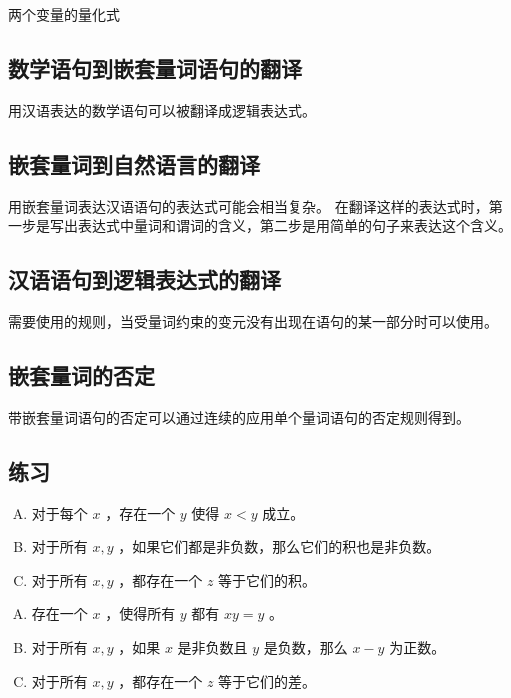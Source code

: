 {{\begin{table}[htb]
            \caption{两个变量的量化式}
        \end{table}
    }

    \subsection{数学语句到嵌套量词语句的翻译}
    {
        用汉语表达的数学语句可以被翻译成逻辑表达式。
    }

    \subsection{嵌套量词到自然语言的翻译}
    {
        用嵌套量词表达汉语语句的表达式可能会相当复杂。
        在翻译这样的表达式时，第一步是写出表达式中量词和谓词的含义，第二步是用简单的句子来表达这个含义。
    }

    \subsection{汉语语句到逻辑表达式的翻译}
    {
        需要使用的规则，当受量词约束的变元没有出现在语句的某一部分时可以使用。
    }

    \subsection{嵌套量词的否定}
    {
        带嵌套量词语句的否定可以通过连续的应用单个量词语句的否定规则得到。
    }

    \subsection{练习}
    {
        \begin{practices}
            \begin{enumerate}[A.]
                \item 对于每个 $x$ ，存在一个 $y$ 使得 $x < y$ 成立。
                \item 对于所有 $x, y$ ，如果它们都是非负数，那么它们的积也是非负数。
                \item 对于所有 $x, y$ ，都存在一个 $z$ 等于它们的积。
            \end{enumerate}
        \end{practices}

        \begin{practices}
            \begin{enumerate}[A.]
                \item 存在一个 $x$ ，使得所有 $y$ 都有 $xy = y$ 。
                \item 对于所有 $x, y$ ，如果 $x$ 是非负数且 $y$ 是负数，那么 $x - y$ 为正数。
                \item 对于所有 $x, y$ ，都存在一个 $z$ 等于它们的差。
            \end{enumerate}
        \end{practices}

}}
